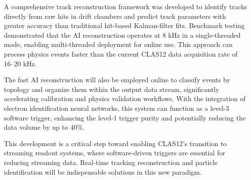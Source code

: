 \documentclass[preprint,12pt]{elsarticle}
\begin{document}
A comprehensive track reconstruction framework was developed to identify tracks directly from raw hits in drift chambers and predict track parameters with greater accuracy than traditional hit-based Kalman-filter fits. Benchmark testing demonstrated that the AI reconstruction operates at 8 kHz in a single-threaded mode, enabling multi-threaded deployment for online use. This approach can process physics events faster than the current CLAS12 data acquisition rate of 16–20 kHz.

The fast AI reconstruction will also be employed online to classify events by topology and organize them within the output data stream, significantly accelerating calibration and physics validation workflows. With the integration of electron identification neural networks, this system can function as a level-3 software trigger, enhancing the level-1 trigger purity and potentially reducing the data volume by up to $40\%$.

This development is a critical step toward enabling CLAS12's transition to streaming readout systems, where software-driven triggers are essential for reducing streaming data. Real-time tracking reconstruction and particle identification will be indispensable solutions in this new paradigm.

\end{document}
